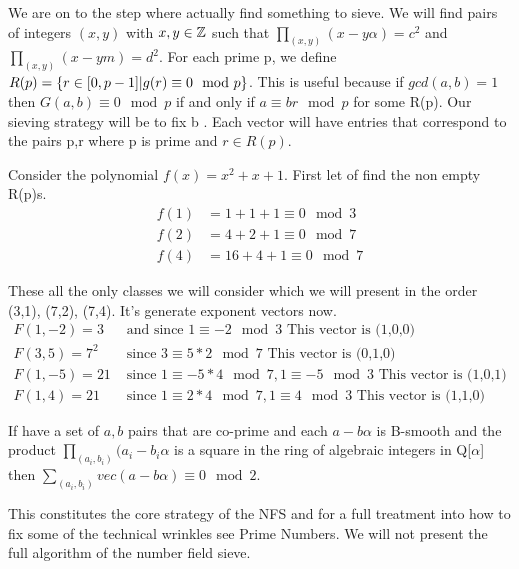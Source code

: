 \documentclass{article}
\begin{document}
We are on to the step where actually find something to sieve. We will find pairs of integers $(x,y)$ with $x, y \in \mathbb{Z}$  such that $\prod_{(x, y) } ( x - y \alpha ) = c^2$ and $\prod_{(x,y)} ( x - ym) = d^2$. For each prime p, we define $R(p) = \{r \in [0, p-1] | g(r) \equiv 0 \mod p \}$. This is useful because if  $gcd(a,b) = 1$ then $G(a,b) \equiv 0 \mod p $ if and only if $a \equiv br \mod p $ for some R(p). Our sieving strategy will be to fix b . Each vector will have entries that correspond to the pairs p,r where p is prime and $r \in R(p)$.
\begin{example}
Consider the polynomial $f(x) = x^2 + x + 1$. First let of find the non empty R(p)s. 
    \begin{align}
        f(1) &= 1 + 1 + 1 \equiv 0 \mod 3 \\
        f(2) &= 4 + 2 + 1 \equiv 0 \mod 7 \\
        f(4) &= 16 + 4 + 1 \equiv 0 \mod 7
    \end{align}
    \end{example}
These all the only classes we will consider which we will present in the order (3,1), (7,2), (7,4). It's generate exponent vectors now. 
\begin{align}
    F(1,-2) = 3 & \text{ and since } 1 \equiv -2 \mod 3 \text{ This vector is (1,0,0)} \\
    F(3,5) = 7^2 & \text{ since } 3 \equiv 5 * 2 \mod 7  \text{ This vector is (0,1,0)} \\
    F(1,-5) = 21 & \text{ since } 1 \equiv -5 * 4 \mod 7 , 1 \equiv -5 \mod 3 \text{ This vector is (1,0,1)} \\
    F(1,4) = 21 & \text{ since } 1 \equiv 2 * 4 \mod 7 , 1 \equiv 4 \mod 3 \text{ This vector is (1,1,0)}
\end{align}
\begin{theorem}
    If have a set of $a,b$ pairs that are co-prime and each $a - b\alpha $ is B-smooth and the product $\prod_{(a_i, b_i)} (a_i - b_i \alpha$ is a square in the ring of algebraic integers in Q[$\alpha$] then $\sum_{(a_i, b_i)} vec(a - b \alpha) \equiv 0 \mod 2$.
\end{theorem}
This constitutes the core strategy of the NFS and for a full treatment into how to fix some of the technical wrinkles see Prime Numbers\cite{crandall2006prime}. We will not present the full algorithm of the number field sieve. 
\end{document}
